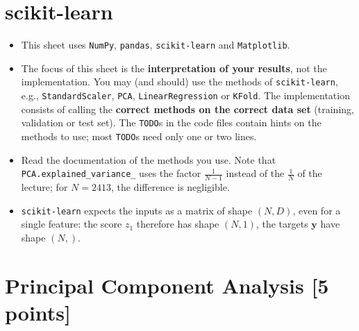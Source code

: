\documentclass[hidelinks,10pt]{article}
\providecommand{\yy}{\mathbf{y}}
\begin{document}
\section*{scikit-learn}
\begin{itemize}
    \item This sheet uses \texttt{NumPy}, \texttt{pandas}, \texttt{scikit-learn} and \texttt{Matplotlib}.
    \item The focus of this sheet is the \textbf{interpretation of your results}, not the implementation. You may (and should) use the methods of \texttt{scikit-learn}, e.g., \texttt{StandardScaler}, \texttt{PCA}, \texttt{LinearRegression} or \texttt{KFold}. The implementation consists of calling the \textbf{correct methods on the correct data set} (training, validation or test set). The \texttt{TODO}s in the code files contain hints on the methods to use; most \texttt{TODO}s need only one or two lines.
    \item Read the documentation of the methods you use. Note that \texttt{PCA.explained\_variance\_} uses the factor $\frac{1}{N-1}$ instead of the $\frac{1}{N}$ of the lecture; for $N = 2413$, the difference is negligible.
    \item \texttt{scikit-learn} expects the inputs as a matrix of shape $(N, D)$, even for a single feature: the score $z_1$ therefore has shape $(N, 1)$, the targets $\yy$ have shape $(N,)$.
\end{itemize}


\section{Principal Component Analysis [5 points]}
\end{document}
